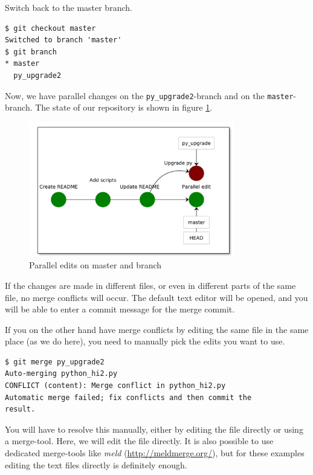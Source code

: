 \documentclass[../main/git_course_main.tex]{subfiles}
\begin{document}
Switch back to the master branch.

\begin{codebox}
\begin{lstlisting}
$ git checkout master
Switched to branch 'master'
$ git branch
* master
  py_upgrade2
\end{lstlisting}
\end{codebox}

Now, we have parallel changes on the \verb$py_upgrade2$-branch and on the \verb$master$-branch. The state of our repository is shown in figure \ref{fig:before_conflict_merge}.

\begin{figure}[h!]
	\centering
	\includegraphics[width=0.8\textwidth]{../visualizations/chapter4/45_parallel_edits_on_master_branch}
	\caption{Parallel edits on master and branch}
	\label{fig:before_conflict_merge}
\end{figure}

If the changes are made in different files, or even in different parts of the same
file, no merge conflicts will occur. The default text editor will be opened,
and you will be able to enter a commit message for the merge commit.

If you on the other hand have merge conflicts by editing the same file in the same place (as we do here), you need to manually pick the edits you want to use.

\begin{codebox}
\begin{lstlisting}
$ git merge py_upgrade2
Auto-merging python_hi2.py
CONFLICT (content): Merge conflict in python_hi2.py
Automatic merge failed; fix conflicts and then commit the 
result.
\end{lstlisting}
\end{codebox}

You will have to
resolve this manually, either by editing the file directly or using a merge-tool.
Here, we will edit the file directly. It is also possible to use dedicated merge-tools like \textit{meld} (\url{http://meldmerge.org/}), but for these examples editing the text files directly is definitely enough. 
\end{document}
